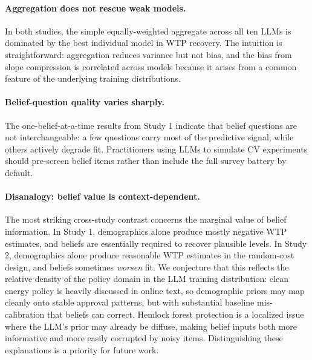 \documentclass[12pt]{article}
\begin{document}
\paragraph{Aggregation does not rescue weak models.} In both studies, the simple equally-weighted aggregate across all ten LLMs is dominated by the best individual model in WTP recovery. The intuition is straightforward: aggregation reduces variance but not bias, and the bias from slope compression is correlated across models because it arises from a common feature of the underlying training distributions.

\paragraph{Belief-question quality varies sharply.} The one-belief-at-a-time results from Study 1 indicate that belief questions are not interchangeable: a few questions carry most of the predictive signal, while others actively degrade fit. Practitioners using LLMs to simulate CV experiments should pre-screen belief items rather than include the full survey battery by default.

\paragraph{Disanalogy: belief value is context-dependent.} The most striking cross-study contrast concerns the marginal value of belief information. In Study 1, demographics alone produce mostly negative WTP estimates, and beliefs are essentially required to recover plausible levels. In Study 2, demographics alone produce reasonable WTP estimates in the random-cost design, and beliefs sometimes \emph{worsen} fit. We conjecture that this reflects the relative density of the policy domain in the LLM training distribution: clean energy policy is heavily discussed in online text, so demographic priors may map cleanly onto stable approval patterns, but with substantial baseline mis-calibration that beliefs can correct. Hemlock forest protection is a localized issue where the LLM's prior may already be diffuse, making belief inputs both more informative and more easily corrupted by noisy items. Distinguishing these explanations is a priority for future work.
\end{document}
